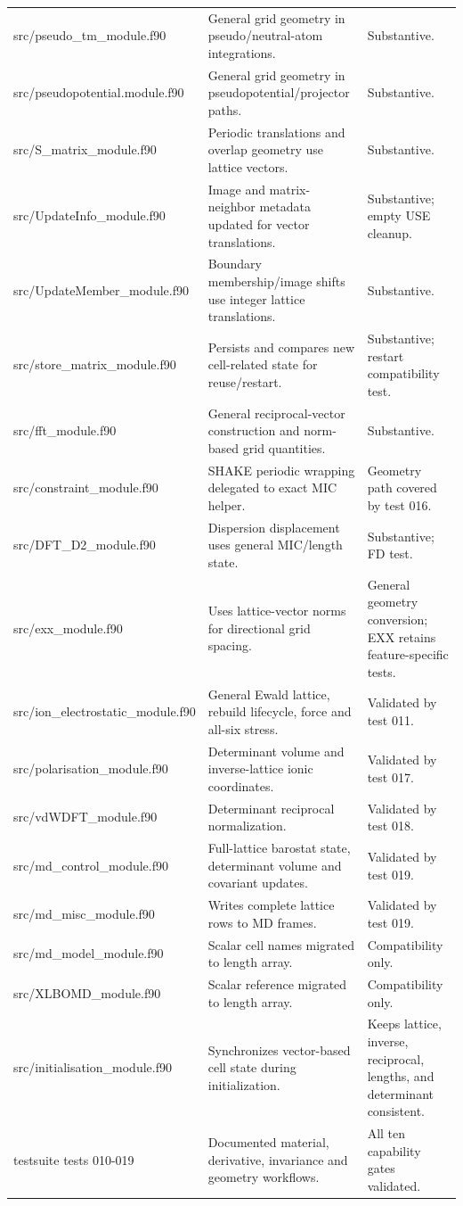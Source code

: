 \documentclass[10pt,a4paper]{report}
\begin{document}
\begin{longtable}{p{}|p{}|p{}}
src/pseudo\_tm\_module.f90 & General grid geometry in pseudo/neutral-atom integrations. & Substantive.\\
src/pseudopotential.module.f90 & General grid geometry in pseudopotential/projector paths. & Substantive.\\
src/S\_matrix\_module.f90 & Periodic translations and overlap geometry use lattice vectors. & Substantive.\\
src/UpdateInfo\_module.f90 & Image and matrix-neighbor metadata updated for vector translations. & Substantive; empty USE cleanup.\\
src/UpdateMember\_module.f90 & Boundary membership/image shifts use integer lattice translations. & Substantive.\\
src/store\_matrix\_module.f90 & Persists and compares new cell-related state for reuse/restart. & Substantive; restart compatibility test.\\
src/fft\_module.f90 & General reciprocal-vector construction and norm-based grid quantities. & Substantive.\\
src/constraint\_module.f90 & SHAKE periodic wrapping delegated to exact MIC helper. & Geometry path covered by test 016.\\
src/DFT\_D2\_module.f90 & Dispersion displacement uses general MIC/length state. & Substantive; FD test.\\
src/exx\_module.f90 & Uses lattice-vector norms for directional grid spacing. & General geometry conversion; EXX retains feature-specific tests.\\
src/ion\_electrostatic\_module.f90 & General Ewald lattice, rebuild lifecycle, force and all-six stress. & Validated by test 011.\\
src/polarisation\_module.f90 & Determinant volume and inverse-lattice ionic coordinates. & Validated by test 017.\\
src/vdWDFT\_module.f90 & Determinant reciprocal normalization. & Validated by test 018.\\
src/md\_control\_module.f90 & Full-lattice barostat state, determinant volume and covariant updates. & Validated by test 019.\\
src/md\_misc\_module.f90 & Writes complete lattice rows to MD frames. & Validated by test 019.\\
src/md\_model\_module.f90 & Scalar cell names migrated to length array. & Compatibility only.\\
src/XLBOMD\_module.f90 & Scalar reference migrated to length array. & Compatibility only.\\
src/initialisation\_module.f90 & Synchronizes vector-based cell state during initialization. & Keeps lattice, inverse, reciprocal, lengths, and determinant consistent.\\
testsuite tests 010-019 & Documented material, derivative, invariance and geometry workflows. & All ten capability gates validated.\\
\bottomrule\end{longtable}\normalsize
\end{document}
